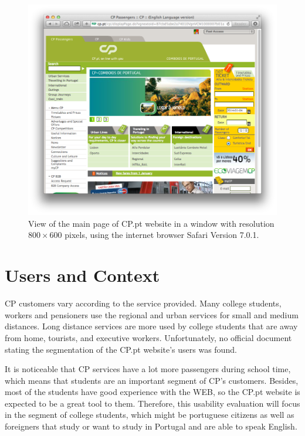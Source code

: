 \documentclass[a4paper]{article}
\begin{document}
\begin{figure}[h] 
	\centering
	\includegraphics[width=\textwidth]{figures/cp_home}
 	\caption{View of the main page of CP.pt website in a window with resolution $800\times 600$ pixels, using the internet browser Safari Version 7.0.1.}\label{fig:cp_home}
\end{figure}

\section{Users and Context}
\label{sec:users_context}

CP customers vary according to the service provided. Many college students, workers and pensioners use the regional and urban services for small and medium distances. Long distance services are more used by college students that are away from home, tourists, and executive workers. Unfortunately, no official document stating the segmentation of the CP.pt website's users was found.

It is noticeable that CP services have a lot more passengers during school time, which means that students are an important segment of CP's customers. Besides, most of the students have good experience with the WEB, so the CP.pt website is expected to be a great tool to them. Therefore, this usability evaluation will focus in the segment of college students, which might be portuguese citizens as well as foreigners that study or want to study in Portugal and are able to speak English.
\end{document}
